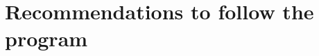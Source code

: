 \documentclass[11pt,xcolor=svgnames]{beamer}
\begin{document}

\section{Recommendations to follow the program}

\end{document}
